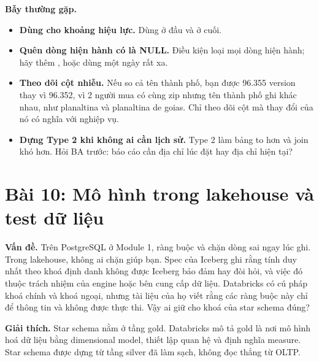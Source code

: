 \begin{luuy}
\textbf{Bẫy thường gặp.}
\begin{itemize}
  \item \textbf{Dùng  cho khoảng hiệu lực.} Dùng \code{>=} ở đầu và \code{<} ở cuối.
  \item \textbf{Quên dòng hiện hành có  là NULL.} Điều kiện  loại mọi dòng hiện hành; hãy thêm , hoặc dùng một ngày rất xa.
  \item \textbf{Theo dõi cột nhiễu.} Nếu so cả tên thành phố, bạn được 96.355 version thay vì 96.352, vì 2 người mua có cùng zip nhưng tên thành phố ghi khác nhau, như planaltina và planaltina de goias. Chỉ theo dõi cột mà thay đổi của nó có nghĩa với nghiệp vụ.
  \item \textbf{Dựng Type 2 khi không ai cần lịch sử.} Type 2 làm bảng to hơn và join khó hơn. Hỏi BA trước: báo cáo cần địa chỉ lúc đặt hay địa chỉ hiện tại?
\end{itemize}
\end{luuy}

\section{Bài 10: Mô hình trong lakehouse và test dữ liệu}

\textbf{Vấn đề.} Trên PostgreSQL ở Module 1, ràng buộc  và  chặn dòng sai ngay lúc ghi. Trong lakehouse, không ai chặn giúp bạn. Spec của Iceberg ghi rằng tính duy nhất theo khoá định danh không được Iceberg bảo đảm hay đòi hỏi, và việc đó thuộc trách nhiệm của engine hoặc bên cung cấp dữ liệu. Databricks có cú pháp khoá chính và khoá ngoại, nhưng tài liệu của họ viết rằng các ràng buộc này chỉ để thông tin và không được thực thi. Vậy ai giữ cho khoá của star schema đúng?

\textbf{Giải thích.} Star schema nằm ở tầng gold. Databricks mô tả gold là nơi mô hình hoá dữ liệu bằng dimensional model, thiết lập quan hệ và định nghĩa measure. Star schema được dựng từ tầng silver đã làm sạch, không đọc thẳng từ OLTP.

